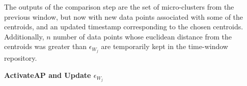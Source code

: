 The outputs of the comparison step are the set of micro-clusters from the previous window, but now with new data points associated with some of the centroids, and an updated timestamp corresponding to the chosen centroids. Additionally, $n$ number of data points whose euclidean distance from the centroids was greater than $\epsilon_{W_j}$ are temporarily kept in the time-window repository.

    
    
\vspace{7mm}
\hspace{-1 cm} 
\textbf{ActivateAP and Update  $\epsilon_{W_j}$}


    

